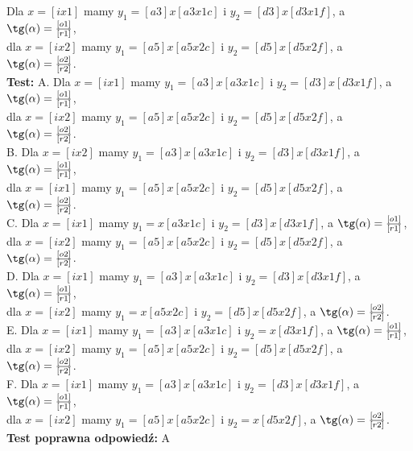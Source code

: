 \documentclass[12pt, a4paper]{article}
\theoremstyle{definition} %
\newcommand{\odpStop}{\newline}                                             %
\newcommand{\testStart}{\noindent \textbf{Test:}\newline} %
\newcommand{\testStop}{\newline} %
\newcommand{\kluczStart}{\noindent \textbf{Test poprawna odpowiedź:}\newline} %
\newcommand{\kluczStop}{\newline} %
\begin{document}
Dla $x=[ix1]$ mamy $y_1=[a3]x [a3x1c]$ i $y_2=[d3]x [d3x1f]$, a $\tg(\alpha)= \frac{[o1]}{[r1]} $,\\
dla $x=[ix2]$ mamy $y_1=[a5]x [a5x2c]$ i $y_2=[d5]x [d5x2f]$, a $\tg(\alpha)= \frac{[o2]}{[r2]} $.\\
\odpStop
\testStart
A. Dla $x=[ix1]$ mamy $y_1=[a3]x [a3x1c]$ i $y_2=[d3]x [d3x1f]$, a $\tg(\alpha)= \frac{[o1]}{[r1]} $,\\
dla $x=[ix2]$ mamy $y_1=[a5]x [a5x2c]$ i $y_2=[d5]x [d5x2f]$, a $\tg(\alpha)= \frac{[o2]}{[r2]} $.\\
B. Dla $x=[ix2]$ mamy $y_1=[a3]x [a3x1c]$ i $y_2=[d3]x [d3x1f]$, a $\tg(\alpha)= \frac{[o1]}{[r1]} $,\\
dla $x=[ix1]$ mamy $y_1=[a5]x [a5x2c]$ i $y_2=[d5]x [d5x2f]$, a $\tg(\alpha)= \frac{[o2]}{[r2]} $.\\
C. Dla $x=[ix1]$ mamy $y_1=x [a3x1c]$ i $y_2=[d3]x [d3x1f]$, a $\tg(\alpha)= \frac{[o1]}{[r1]} $,\\
dla $x=[ix2]$ mamy $y_1=[a5]x [a5x2c]$ i $y_2=[d5]x [d5x2f]$, a $\tg(\alpha)= \frac{[o2]}{[r2]} $.\\
D. Dla $x=[ix1]$ mamy $y_1=[a3]x [a3x1c]$ i $y_2=[d3]x [d3x1f]$, a $\tg(\alpha)= \frac{[o1]}{[r1]} $,\\
dla $x=[ix2]$ mamy $y_1=x [a5x2c]$ i $y_2=[d5]x [d5x2f]$, a $\tg(\alpha)= \frac{[o2]}{[r2]} $.\\
E. Dla $x=[ix1]$ mamy $y_1=[a3]x [a3x1c]$ i $y_2=x [d3x1f]$, a $\tg(\alpha)= \frac{[o1]}{[r1]} $,\\
dla $x=[ix2]$ mamy $y_1=[a5]x [a5x2c]$ i $y_2=[d5]x [d5x2f]$, a $\tg(\alpha)= \frac{[o2]}{[r2]} $.\\
F. Dla $x=[ix1]$ mamy $y_1=[a3]x [a3x1c]$ i $y_2=[d3]x [d3x1f]$, a $\tg(\alpha)= \frac{[o1]}{[r1]} $,\\
dla $x=[ix2]$ mamy $y_1=[a5]x [a5x2c]$ i $y_2=x [d5x2f]$, a $\tg(\alpha)= \frac{[o2]}{[r2]} $.\\
\testStop
\kluczStart
A
\kluczStop
\end{document}
